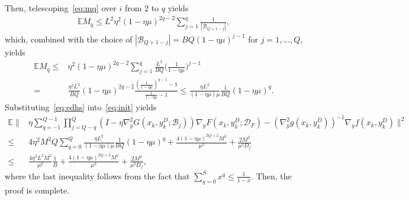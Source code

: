\documentclass{osudissert96}
\def\gB{{\mathcal{B}}}
\def\gD{{\mathcal{D}}}
\begin{document}
Then, telescoping~\cref{eq:mq} over $i$ from $2$ to $q$ yields
\begin{align*}%
\mathbb{E} M_q \leq L^2\eta^2(1-\eta\mu)^{2q-2}\sum_{j=1}^q \frac{1}{|\gB_{Q+1-j}|},
\end{align*}
which, combined with the choice of $|\gB_{Q+1-j}|=BQ(1-\eta\mu)^{j-1}$ for $j=1,...,Q$, yields
\begin{align}\label{eq:edhs}
\mathbb{E} M_q \leq &\eta^2(1-\eta\mu)^{2q-2}  \sum_{j=1}^q \frac{L^2}{BQ} \Big(\frac{1}{1-\eta\mu}\Big)^{j-1} \nonumber
\\=&\frac{\eta^2L^2}{BQ} (1-\eta\mu)^{2q-2} \frac{\left(\frac{1}{1-\eta\mu}\right)^{q-1}-1}{\frac{1}{1-\eta\mu} -1} \leq  \frac{\eta L^2}{(1-\eta\mu)\mu} \frac{1}{BQ}(1-\eta\mu)^q.
\end{align}
Substituting~\cref{eq:edhs} into~\cref{eq:init} yields
{\small\begin{align}
\mathbb{E} \bigg\|& \eta \sum_{q=-1}^{Q-1}\prod_{j=Q-q}^Q (I - \eta \nabla_y^2G(x_k,y_k^D;\gB_j)) \nabla_y F(x_k,y_k^D;\gD_F)-( \nabla_y^2 g(x_k,y_k^D))^{-1}\nabla_y f(x_k,y_k^D)\bigg\|^2 \nonumber
\\\leq& 4\eta^2 M^2 Q \sum_{q=0}^{Q} \frac{\eta L^2}{(1-\eta\mu)\mu} \frac{1}{BQ}(1-\eta\mu)^q+\frac{4(1-\eta \mu)^{2Q+2}M^2}{\mu^2}  + \frac{2M^2}{\mu^2D_f}  \nonumber
\\\leq &\frac{4\eta^2  L^2M^2}{\mu^2} \frac{1}{B}+\frac{4(1-\eta \mu)^{2Q+2}M^2}{\mu^2}+ \frac{2M^2}{\mu^2D_f} ,
\end{align} }
\hspace{-0.12cm}where the last inequality follows from the fact that $\sum_{q=0}^S x^{q}\leq \frac{1}{1-x}$. Then, the proof is complete.
\end{document}
